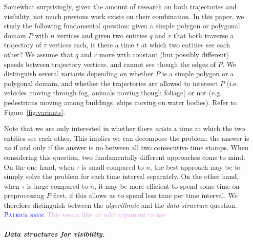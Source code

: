 \documentclass[UKenglish]{lipics-v2019}
\newcommand{\myremark}[4]{\textcolor{blue}{\textsc{#1 #2:}} \textcolor{#4}{\textsf{#3}}}
\newcommand{\patrick}[2][says]{\myremark{Patrick}{#1}{#2}{Plum}}
\begin{document}
Somewhat surprisingly, given the amount of research on both trajectories and visibility, not much previous work exists on their combination.
%
In this paper, we study the following fundamental question:
  given a simple polygon or polygonal domain $P$ with $n$ vertices and given two entities $q$ and $r$ that both traverse a trajectory of $\tau$ vertices each, is there a time $t$ at which two entities see each other?
  We assume that $q$ and $r$ move with constant (but possibly different) speeds between trajectory vertices, and cannot see though the edges of $P$.
  We distinguish several variants depending on whether $P$ is a simple polygon or a polygonal domain, and whether the trajectories are allowed to intersect $P$ (i.e. vehicles moving through fog, animals moving though foliage) or not (e.g. pedestrians moving among buildings, ships moving on water bodies). Refer to Figure~\ref {fig:variants}.
%

Note that we are only interested in whether there {\em
  exists} a time at which the two entities see each other. %
This implies we can decompose the problem: the answer is {\em no} if and only if the answer is no between all two consecutive time stamps.
When considering this question, two fundamentally different approaches come to mind. On the one hand, when $\tau$ is small compared to $n$, the best approach may be to simply solve the problem for each time interval separately. On the other hand, when $\tau$ is large compared to $n$, it may be more efficient to spend some time on preprocessing $P$ first, if this allows us to spend less time per time interval.
We therefore distinguish between the {\em algorithmic} and the {\em data structure} question. \patrick{This seems like an odd argument to me}

\subparagraph {Data structures for visibility.}
\end{document}
